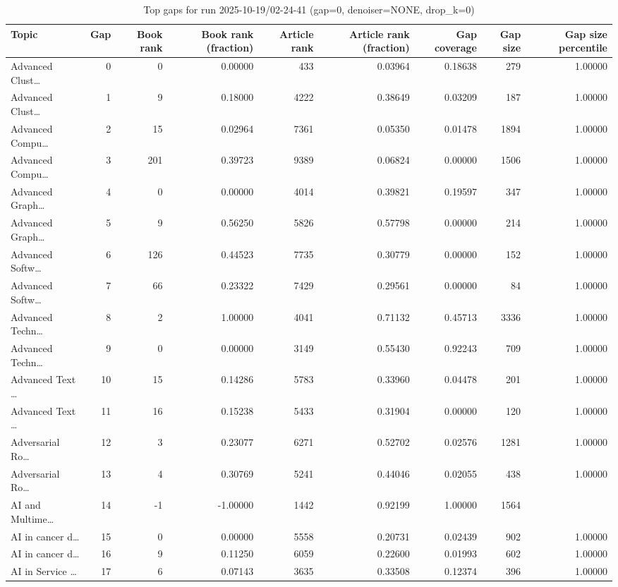 \begin{table}
\caption{Top gaps for run 2025-10-19/02-24-41 (gap=0, denoiser=NONE, drop\_k=0)}
\label{tab:best_run_gap0_2025_10_19_02_24_41}
\begin{tabular}{lrrrrrrrr}
\toprule
Topic & Gap & Book rank & Book rank (fraction) & Article rank & Article rank (fraction) & Gap coverage & Gap size & Gap size percentile \\
\midrule
Advanced Clust… & 0 & 0 & 0.00000 & 433 & 0.03964 & 0.18638 & 279 & 1.00000 \\
Advanced Clust… & 1 & 9 & 0.18000 & 4222 & 0.38649 & 0.03209 & 187 & 1.00000 \\
Advanced Compu… & 2 & 15 & 0.02964 & 7361 & 0.05350 & 0.01478 & 1894 & 1.00000 \\
Advanced Compu… & 3 & 201 & 0.39723 & 9389 & 0.06824 & 0.00000 & 1506 & 1.00000 \\
Advanced Graph… & 4 & 0 & 0.00000 & 4014 & 0.39821 & 0.19597 & 347 & 1.00000 \\
Advanced Graph… & 5 & 9 & 0.56250 & 5826 & 0.57798 & 0.00000 & 214 & 1.00000 \\
Advanced Softw… & 6 & 126 & 0.44523 & 7735 & 0.30779 & 0.00000 & 152 & 1.00000 \\
Advanced Softw… & 7 & 66 & 0.23322 & 7429 & 0.29561 & 0.00000 & 84 & 1.00000 \\
Advanced Techn… & 8 & 2 & 1.00000 & 4041 & 0.71132 & 0.45713 & 3336 & 1.00000 \\
Advanced Techn… & 9 & 0 & 0.00000 & 3149 & 0.55430 & 0.92243 & 709 & 1.00000 \\
Advanced Text … & 10 & 15 & 0.14286 & 5783 & 0.33960 & 0.04478 & 201 & 1.00000 \\
Advanced Text … & 11 & 16 & 0.15238 & 5433 & 0.31904 & 0.00000 & 120 & 1.00000 \\
Adversarial Ro… & 12 & 3 & 0.23077 & 6271 & 0.52702 & 0.02576 & 1281 & 1.00000 \\
Adversarial Ro… & 13 & 4 & 0.30769 & 5241 & 0.44046 & 0.02055 & 438 & 1.00000 \\
AI and Multime… & 14 & -1 & -1.00000 & 1442 & 0.92199 & 1.00000 & 1564 &  \\
AI in cancer d… & 15 & 0 & 0.00000 & 5558 & 0.20731 & 0.02439 & 902 & 1.00000 \\
AI in cancer d… & 16 & 9 & 0.11250 & 6059 & 0.22600 & 0.01993 & 602 & 1.00000 \\
AI in Service … & 17 & 6 & 0.07143 & 3635 & 0.33508 & 0.12374 & 396 & 1.00000 \\

\end{tabular}
\end{table}
